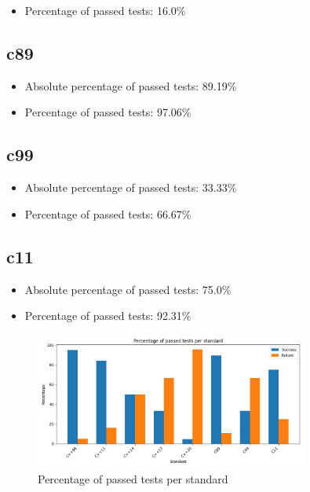 \documentclass{article}
\begin{document}
\begin{itemize}
\item Percentage of passed tests: 16.0\%\end{itemize}\subsection{c89}\begin{itemize}\item Absolute percentage of passed tests: 89.19\%

\item Percentage of passed tests: 97.06\%\end{itemize}\subsection{c99}\begin{itemize}\item Absolute percentage of passed tests: 33.33\%

\item Percentage of passed tests: 66.67\%\end{itemize}\subsection{c11}\begin{itemize}\item Absolute percentage of passed tests: 75.0\%

\item Percentage of passed tests: 92.31\%\end{itemize}\begin{figure}[h!]
\centering
\includegraphics[width=0.8\textwidth]{../reports/clava/images/global_percentage.png}
\caption{Percentage of passed tests per standard}
\label{fig:global_percentage}
\end{figure}
\end{document}
